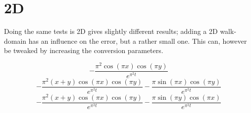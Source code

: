 \section{2D}
Doing the same tests is 2D gives slightly different results; adding a 2D walk-domain has an influence on the error, but a rather small one. 
This can, however be tweaked by increasing the conversion parameters.

\begin{equation}
 - \frac{\pi^{2} \operatorname{cos}\left(\pi x\right) \operatorname{cos}\left(\pi y\right)}{e^{\pi^{2} t}}
\end{equation}
\begin{equation}
- \frac{\pi^{2} \left(x + y\right) \operatorname{cos}\left(\pi x\right) \operatorname{cos}\left(\pi y\right)}{e^{\pi^{2} t}} - \frac{\pi \operatorname{sin}\left(\pi x\right) \operatorname{cos}\left(\pi y\right)}{e^{\pi^{2} t}}
\end{equation}
\begin{equation}
- \frac{\pi^{2} \left(x + y\right) \operatorname{cos}\left(\pi x\right) \operatorname{cos}\left(\pi y\right)}{e^{\pi^{2} t}} - \frac{\pi \operatorname{sin}\left(\pi y\right) \operatorname{cos}\left(\pi x\right)}{e^{\pi^{2} t}}
\end{equation}

